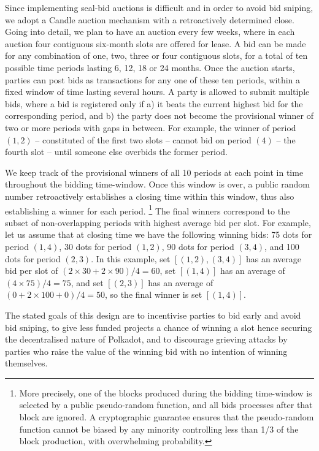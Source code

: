 Since implementing seal-bid auctions is difficult and in order to avoid bid sniping, we adopt a Candle auction \cite{Fuellbrunn:2012:CandleAuction} mechanism with a retroactively determined close. 
Going into detail, we plan to have an auction every few weeks, where in each auction four contiguous six-month slots are offered for lease. A bid can be made for any combination of one, two, three or four contiguous slots, for a total of ten possible time periods lasting 6, 12, 18 or 24 months. Once the auction starts, parties can post bids as transactions for any one of these ten periods, within a fixed window of time lasting several hours. A party is allowed to submit multiple bids, where a bid is registered only if a) it beats the current highest bid for the corresponding period, and b) the party does not become the provisional winner of two or more periods with gaps in between. For example, the winner of period $(1,2)$ -- constituted of the first two slots -- cannot bid on period $(4)$ -- the fourth slot -- until someone else overbids the former period. 

We keep track of the provisional winners of all 10 periods at each point in time throughout the bidding time-window. Once this window is over, a public random number retroactively establishes a closing time within this window, thus also establishing a winner for each period.%
\footnote{More precisely, one of the blocks produced during the bidding time-window is selected by a public pseudo-random function, and all bids processes after that block are ignored. A cryptographic guarantee ensures that the pseudo-random function cannot be biased by any minority controlling less than 1/3 of the block production, with overwhelming probability.} %
The final winners correspond to the subset of non-overlapping periods with highest average bid per slot. For example, let us assume that at closing time we have the following winning bids: 75 dots for period $(1,4)$, 30 dots for period $(1,2)$, 90 dots for period $(3,4)$, and 100 dots for period $(2,3)$. In this example, set $[(1,2), (3,4)]$ has an average bid per slot of $(2\times 30 + 2\times 90)/4 = 60$, set $[(1,4)]$ has an average of $(4\times 75)/4 = 75$, and set $[(2,3)]$ has an average of $(0+2\times 100+0)/4=50$, so the final winner is set $[(1,4)]$. 

The stated goals of this design are to incentivise parties to bid early and avoid bid sniping, to give less funded projects a chance of winning a slot hence securing the decentralised nature of Polkadot, and to discourage grieving attacks by parties who raise the value of the winning bid with no intention of winning themselves.

